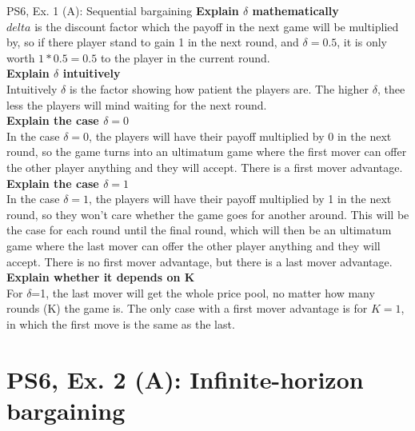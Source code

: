 \begin{frame}{PS6, Ex. 1 (A): Sequential bargaining }
    \textbf{Explain $\delta$ mathematically\\}
    $delta$ is the discount factor which the payoff in the next game will be multiplied by, so if there player stand to gain 1 in the next round, and $\delta=0.5$, it is only worth $1*0.5=0.5$ to the player in the current round.\\
    \textbf{Explain $\delta$ intuitively}\\ Intuitively $\delta$ is the factor showing how patient the players are. The higher $\delta$, thee less the players will mind waiting for the next round.  \\
    \textbf{Explain the case $\delta=0$}\\
    In the case $\delta=0$, the players will have their payoff multiplied by 0 in the next round, so the game turns into an ultimatum game where the first mover can offer the other player anything and they will accept. There is a first mover advantage. \\
    \textbf{Explain the case $\delta=1$}\\
    In the case $\delta=1$, the players will have their payoff multiplied by 1 in the next round, so they won't care whether the game goes for another around. This will be the case for each round until the final round, which will then be an ultimatum game where the last mover can offer the other player anything and they will accept. There is no first mover advantage, but there is a last mover advantage. \\
    \textbf{Explain whether it depends on K}\\
    For $\delta$=1, the last mover will get the whole price pool, no matter how many rounds (K) the game is. The only case with a first mover advantage is for $K=1$, in which the first move is the same as the last.\\
    \vfill\null
\end{frame}

\section{PS6, Ex. 2 (A): Infinite-horizon bargaining}



